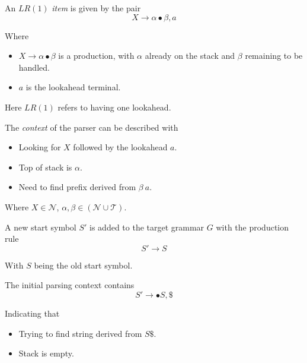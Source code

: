 \begin{definition}[$LR(1)$ Item]
    An $LR(1)$ \textit{item} is given by the pair
    \begin{equation}
        X \to \alpha \bullet \beta, a
    \end{equation}
    
    Where
    \begin{itemize}
        \item $X \to \alpha \bullet \beta$ is a production, with $\alpha$ already on the stack and $\beta$ remaining to be handled.
        \item $a$ is the lookahead terminal.
    \end{itemize}
    
    Here $LR(1)$ refers to having one lookahead.
\end{definition}

\begin{definition}
    The \textit{context} of the parser can be described with
    \begin{equation}
        [X \to \alpha \bullet \beta, a]
    \end{equation}
    
    \begin{itemize}
        \item Looking for $X$ followed by the lookahead $a$.
        \item Top of stack is $\alpha$.
        \item Need to find prefix derived from $\beta\ a$.
    \end{itemize}
    
    Where $X \in \mathcal{N}$, $\alpha, \beta \in (\mathcal{N} \cup \mathcal{T})$.
\end{definition}

\begin{definition}
    A new start symbol $S\prime$ is added to the target grammar $G$ with the production rule
    \begin{equation}
        S\prime \to S
    \end{equation}
    
    With $S$ being the old start symbol.
    
    The initial parsing context contains
    \begin{equation}
        S\prime \to \bullet S, \$
    \end{equation}
    
    Indicating that
    \begin{itemize}
        \item Trying to find string derived from $S\$$.
        \item Stack is empty.
    \end{itemize}
\end{definition}

